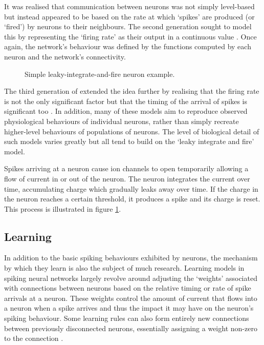 			It was realised that communication between neurons was not simply
			level-based but instead appeared to be based on the rate at which `spikes'
			are produced (or `fired') by neurons to their neighbours. The second
			generation sought to model this by representing the `firing rate' as their
			output in a continuous value \cite{maass97}. Once again, the network's
			behaviour was defined by the functions computed by each neuron and the
			network's connectivity.
			
			\begin{figure}
				\center
				
				\caption{Simple leaky-integrate-and-fire neuron example.}
				\label{fig:snn-example}
			\end{figure}
			
			The third generation of extended the idea further by realising that
			the firing rate is not the only significant factor but that the timing of
			the arrival of spikes is significant too \cite{maass01}. In addition, many
			of these models aim to reproduce observed physiological behaviours of
			individual neurons, rather than simply recreate higher-level behaviours of
			populations of neurons. The level of biological detail of such models
			varies greatly but all tend to build on the `leaky integrate and fire'
			model.
			
			Spikes arriving at a neuron cause ion channels to open temporarily
			allowing a flow of current in or out of the neuron. The neuron integrates
			the current over time, accumulating charge which gradually leaks away over
			time. If the charge in the neuron reaches a certain threshold, it produces
			a spike and its charge is reset. This process is illustrated in figure
			\ref{fig:snn-example}.
		
		\subsection{Learning}
			
			In addition to the basic spiking behaviours exhibited by neurons, the
			mechanism by which they learn is also the subject of much research.
			Learning models in spiking neural networks largely revolve around
			adjusting the `weights' associated with connections between neurons based
			on the relative timing \cite{pfister06} or rate \cite{bienenstock82} of
			spike arrivals at a neuron. These weights control the amount of current
			that flows into a neuron when a spike arrives and thus the impact it may
			have on the neuron's spiking behaviour. Some learning rules can also form
			entirely new connections between previously disconnected neurons,
			essentially assigning a weight non-zero to the connection
			\cite{bamford10}.
		
